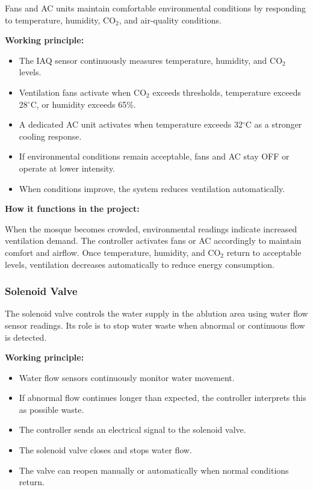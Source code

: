 Fans and AC units maintain comfortable environmental conditions by responding to temperature, humidity, CO$_2$, and air-quality conditions.

\textbf{Working principle:}
\begin{itemize}
    \item The IAQ sensor continuously measures temperature, humidity, and CO$_2$ levels.
    \item Ventilation fans activate when CO$_2$ exceeds thresholds, temperature exceeds 28$^\circ$C, or humidity exceeds 65\%.
    \item A dedicated AC unit activates when temperature exceeds 32$^\circ$C as a stronger cooling response.
    \item If environmental conditions remain acceptable, fans and AC stay OFF or operate at lower intensity.
    \item When conditions improve, the system reduces ventilation automatically.
\end{itemize}

\textbf{How it functions in the project:}

When the mosque becomes crowded, environmental readings indicate increased ventilation demand. The controller activates fans or AC accordingly to maintain comfort and airflow. Once temperature, humidity, and CO$_2$ return to acceptable levels, ventilation decreases automatically to reduce energy consumption.


\subsubsection{Solenoid Valve}

The solenoid valve controls the water supply in the ablution area using water flow sensor readings. Its role is to stop water waste when abnormal or continuous flow is detected.

\textbf{Working principle:}
\begin{itemize}
    \item Water flow sensors continuously monitor water movement.
    \item If abnormal flow continues longer than expected, the controller interprets this as possible waste.
    \item The controller sends an electrical signal to the solenoid valve.
    \item The solenoid valve closes and stops water flow.
    \item The valve can reopen manually or automatically when normal conditions return.
\end{itemize}

